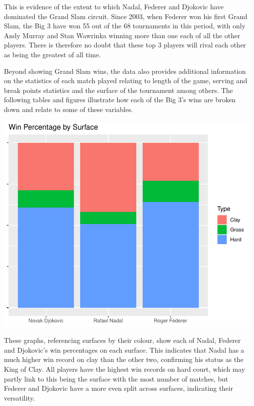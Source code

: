 \documentclass[11pt,preprint, authoryear]{elsarticle}
\numberwithin{equation}{section}
\numberwithin{figure}{section}
\numberwithin{table}{section}
\begin{document}
This is evidence of the extent to which Nadal, Federer and Djokovic have
dominated the Grand Slam circuit. Since 2003, when Federer won his first
Grand Slam, the Big 3 have won 55 out of the 68 tournaments in this
period, with only Andy Murray and Stan Wawrinka winning more than one
each of all the other players. There is therefore no doubt that these
top 3 players will rival each other as being the greatest of all time.

Beyond showing Grand Slam wins, the data also provides additional
information on the statistics of each match played relating to length of
the game, serving and break points statistics and the surface of the
tournament among others. The following tables and figures illustrate how
each of the Big 3's wins are broken down and relate to some of these
variables.

\includegraphics{Write-up_files/figure-latex/more descriptive-1.pdf}

These graphs, referencing surfaces by their colour, show each of Nadal,
Federer and Djokovic's win percentages on each surface. This indicates
that Nadal has a much higher win record on clay than the other two,
confirming his status as the King of Clay. All players have the highest
win records on hard court, which may partly link to this being the
surface with the most number of matches, but Federer and Djokovic have a
more even split across surfaces, indicating their versatility.
\end{document}
